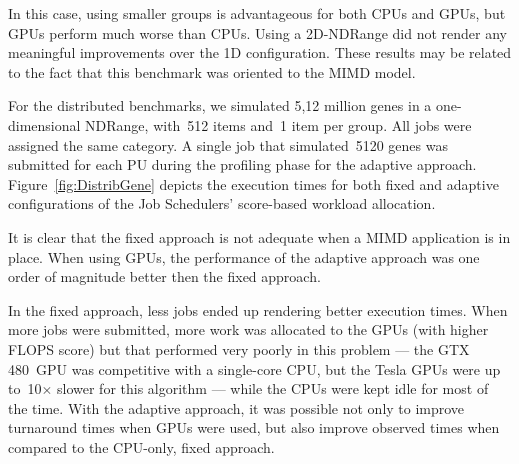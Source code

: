 \documentclass[runningheads,a4paper]{llncs}
\begin{document}


In this case, using smaller groups is advantageous for both CPUs and GPUs, but GPUs perform much worse than CPUs. Using a 2D-NDRange did not render any meaningful improvements over the 1D configuration. These results may be related to the fact that this benchmark was oriented to the MIMD model.


For the distributed benchmarks, we simulated 5,12 million genes in a one-dimensional NDRange, with~512 items and~1 item per group. All jobs were assigned the same category. A single job that simulated~5120 genes was submitted for each PU during the profiling phase for the adaptive approach. Figure~\ref{fig:DistribGene} depicts the execution times for both fixed and adaptive configurations of the Job Schedulers' score-based workload allocation.


It is clear that the fixed approach is not adequate when a MIMD application is in place. When using GPUs, the performance of the adaptive approach was one order of magnitude better then the fixed approach. 

In the fixed approach, less jobs ended up rendering better execution times. When more jobs were submitted, more work was allocated to the GPUs (with higher FLOPS score) but that performed very poorly in this problem --- the GTX$\,$480~GPU was competitive with a single-core CPU, but the Tesla GPUs were up to~10$\times$ slower for this algorithm --- while the CPUs were kept idle for most of the time. With the adaptive approach, it was possible not only to improve turnaround times when GPUs were used, but also improve observed times when compared to the CPU-only, fixed approach. 
\end{document}
